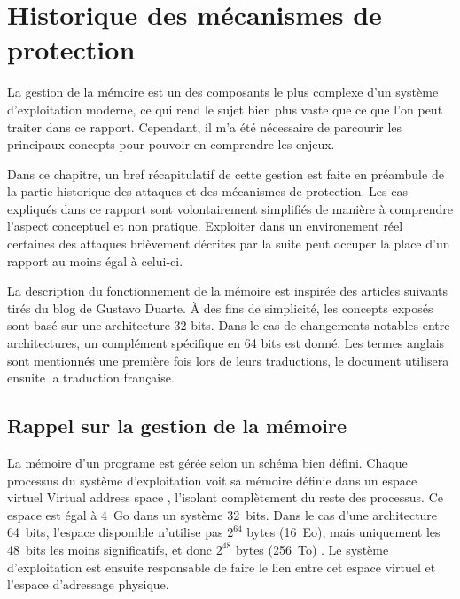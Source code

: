 \chapter{Historique des mécanismes de protection}
\label{chap:historique}

La gestion de la mémoire est un des composants le plus complexe d'un système d'exploitation moderne, ce qui rend le sujet bien plus vaste que ce que l'on peut traiter dans ce rapport. Cependant, il m'a été nécessaire de parcourir les principaux concepts pour pouvoir en comprendre les enjeux.

Dans ce chapitre, un bref récapitulatif de cette gestion est faite en préambule de la partie historique des attaques et des mécanismes de protection. Les cas expliqués dans ce rapport sont volontairement simplifiés de manière à comprendre l'aspect conceptuel et non pratique. Exploiter dans un environement réel certaines des attaques brièvement décrites par la suite peut occuper la place d'un rapport au moins égal à celui-ci.

La description du fonctionnement de la mémoire est inspirée des articles suivants \cite{AnatomyOfAProgramInMemory, HowTheKernelManagesYourMemory, JourneyToTheStackPartI} tirés du blog de Gustavo Duarte. À des fins de simplicité, les concepts exposés sont basé sur une architecture 32 bits. Dans le cas de changements notables entre architectures, un complément spécifique en 64 bits est donné. Les termes anglais sont mentionnés une première fois lors de leurs traductions, le document utilisera ensuite la traduction française.

\minitoc

\newpage

\section{Rappel sur la gestion de la mémoire}

La mémoire d'un programe est gérée selon un schéma bien défini. Chaque processus du système d'exploitation voit sa mémoire définie dans un espace virtuel \og Virtual address space \fg, l'isolant complètement du reste des processus. Ce espace est égal à 4~Go dans un système 32~bits. Dans le cas d'une architecture 64~bits, l'espace disponible n'utilise pas $2^{64}$ bytes (16~Eo), mais uniquement les 48~bits les moins significatifs, et donc $2^{48}$ bytes (256~To) \cite{64bitComputing,VirtualAddressSpaceDetails}. Le système d'exploitation est ensuite responsable de faire le lien entre cet espace virtuel et l'espace d'adressage physique.

